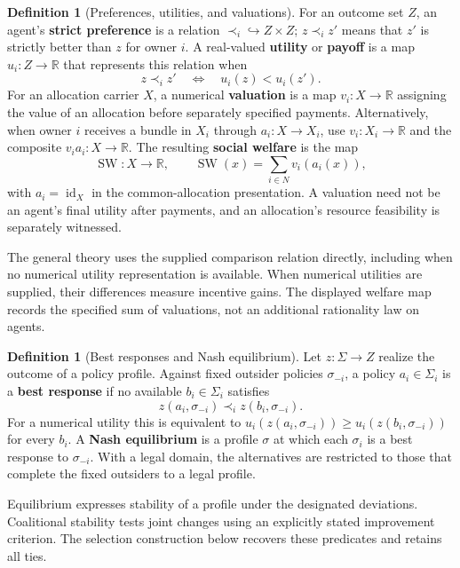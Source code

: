 \documentclass[11pt,a4paper]{article}
\numberwithin{equation}{section}
\theoremstyle{definition}
\newtheorem{definition}[theorem]{Definition}
\theoremstyle{remark}
\theoremstyle{plain}
\begin{document}
\begin{definition}[Preferences, utilities, and valuations]
\label{def:egt-preferences-utility}
For an outcome set $Z$, an agent's \textbf{strict preference}
is a relation $\prec_i\hookrightarrow Z\times Z$; $z\prec_i z'$ means
that $z'$ is strictly better than $z$ for owner $i$. A real-valued
\textbf{utility} or \textbf{payoff} is a map $u_i:Z\to\mathbb R$ that
represents this relation when
\[
 z\prec_i z'\quad\Longleftrightarrow\quad u_i(z)<u_i(z').
\]
For an allocation carrier $X$, a numerical \textbf{valuation} is a map
$v_i:X\to\mathbb R$ assigning the value of an allocation before
separately specified payments. Alternatively, when owner $i$ receives a
bundle in $X_i$ through $a_i:X\to X_i$, use
$v_i:X_i\to\mathbb R$ and the composite $v_i a_i:X\to\mathbb R$.
The resulting \textbf{social welfare} is the map
\[
 \operatorname{SW}:X\longrightarrow\mathbb R,\qquad
 \operatorname{SW}(x)=\sum_{i\in N}v_i(a_i(x)),
\]
with $a_i=\operatorname{id}_X$ in the common-allocation presentation.
A valuation need not be an agent's final utility after payments,
and an allocation's resource feasibility is separately witnessed.
\end{definition}
The general theory uses the supplied comparison relation directly, including when no numerical utility representation is available. When numerical utilities are supplied, their
differences measure incentive gains. The displayed welfare map records the specified sum of valuations,
not an additional rationality law on agents.

\begin{definition}[Best responses and Nash equilibrium]
\label{def:egt-best-response-nash}
Let $z:\Sigma\to Z$ realize the outcome of a policy profile. Against fixed
outsider policies $\sigma_{-i}$, a policy $a_i\in\Sigma_i$ is a
\textbf{best response} if no available $b_i\in\Sigma_i$ satisfies
\[
 z(a_i,\sigma_{-i})\prec_i z(b_i,\sigma_{-i}).
\]
For a numerical utility this is equivalent to
$u_i(z(a_i,\sigma_{-i}))\geq u_i(z(b_i,\sigma_{-i}))$ for every $b_i$.
A \textbf{Nash equilibrium} is a profile $\sigma$ at which each $\sigma_i$
is a best response to $\sigma_{-i}$. With a legal domain, the alternatives
are restricted to those that complete the fixed outsiders to a legal profile.
\end{definition}

Equilibrium expresses stability of a profile under the designated deviations. Coalitional stability tests joint changes
using an explicitly stated improvement criterion. The selection construction
below recovers these predicates and retains all ties.
\end{document}
